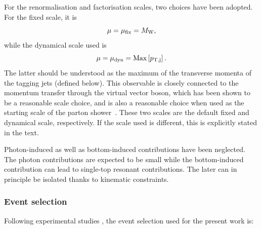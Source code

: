 \documentclass[11pt]{cernrep}
\begin{document}
For the renormalisation and factorisation scales, two choices have been adopted.
For the fixed scale, it is
%
\begin{equation}
 \mu = \mu_{\rm fix} = M_{\rm W},
\end{equation}
%
while the dynamical scale used is
%
\begin{equation}
 \mu = \mu_{\rm dyn} = {\rm Max}\left[p_{\rm T, j}\right].
\end{equation}
%
The latter should be understood as the maximum of the transverse momenta of the tagging jets (defined below).
This observable is closely connected to the momentum transfer through
the virtual vector boson, which has been shown to be a reasonable scale
choice, and is also a reasonable choice when used as the starting scale
of the parton shower~\cite{Rauch:2016upa}.
These two scales are the default fixed and dynamical scale, respectively.
If the scale used is different, this is explicitly stated in the text.

Photon-induced as well as bottom-induced contributions have been neglected.
The photon contributions are expected to be small \cite{Biedermann:2017bss} while the bottom-induced contribution can lead to single-top resonant contributions.
The later can in principle be isolated thanks to kinematic constraints.

\subsubsection*{Event selection}

Following experimental studies \cite{Aad:2016ett,CMS-PAS-SMP-14-008}, the event selection used for the present work is:
\end{document}
